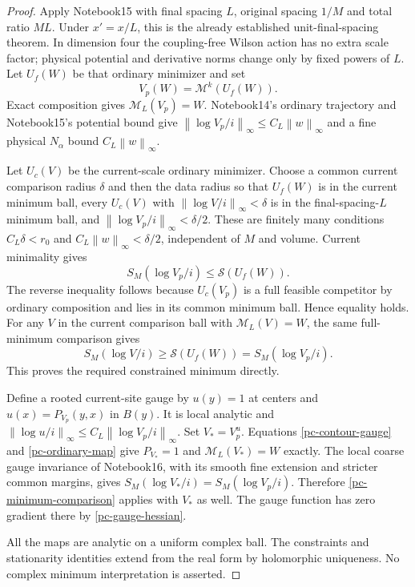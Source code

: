 \documentclass[11pt]{article}
\newcommand{\norm}[1]{\left\|#1\right\|}
\begin{document}
\begin{proof}
Apply Notebook15 with final spacing $L$, original spacing
$1/M$ and total ratio $ML$. Under $x'=x/L$, this is the
already established unit-final-spacing theorem. In dimension
four the coupling-free Wilson action has no extra scale
factor; physical potential and derivative norms change only
by fixed powers of $L$. Let $U_f(W)$ be that ordinary
minimizer and set
\[
 V_p(W)=\mathcal M^k(U_f(W)).
\]
Exact composition gives $\mathcal M_L(V_p)=W$.
Notebook14's ordinary trajectory and Notebook15's potential
bound give $\norm{\log V_p/i}_\infty\le C_L\norm w_\infty$
and a fine physical $N_\alpha$ bound $C_L\norm w_\infty$.

Let $U_c(V)$ be the current-scale ordinary minimizer. Choose a
common current comparison radius $\delta$ and then the data
radius so that $U_f(W)$ is in the current minimum ball,
every $U_c(V)$ with $\norm{\log V/i}_\infty<\delta$ is in
the final-spacing-$L$ minimum ball, and
$\norm{\log V_p/i}_\infty<\delta/2$. These are finitely many
conditions $C_L\delta<r_0$ and
$C_L\norm w_\infty<\delta/2$, independent of $M$ and volume.
Current minimality gives
\[
 S_M(\log V_p/i)\le\mathcal S(U_f(W)).
\]
The reverse inequality follows because $U_c(V_p)$ is a full
feasible competitor by ordinary composition and lies in its
common minimum ball. Hence equality holds. For any $V$ in the
current comparison ball with $\mathcal M_L(V)=W$, the same
full-minimum comparison gives
\begin{equation}\label{pc-minimum-comparison}
 S_M(\log V/i)\ge\mathcal S(U_f(W))=S_M(\log V_p/i).
\end{equation}
This proves the required constrained minimum directly.

Define a rooted current-site gauge by
$u(y)=1$ at centers and $u(x)=P_{V_p}(y,x)$ in $B(y)$.
It is local analytic and
$\norm{\log u/i}_\infty\le C_L\norm{\log V_p/i}_\infty$.
Set $V_*=V_p^u$. Equations
\eqref{pc-contour-gauge} and \eqref{pc-ordinary-map} give
$P_{V_*}=1$ and $\mathcal M_L(V_*)=W$ exactly. The local
coarse gauge invariance of Notebook16, with its smooth fine
extension and stricter common margins, gives
$S_M(\log V_*/i)=S_M(\log V_p/i)$. Therefore
\eqref{pc-minimum-comparison} applies with $V_*$ as well.
The gauge function has zero gradient there by
\eqref{pc-gauge-hessian}.

All the maps are analytic on a uniform complex ball. The
constraints and stationarity identities extend from the real
form by holomorphic uniqueness. No complex minimum
interpretation is asserted.
\end{proof}
\end{document}
